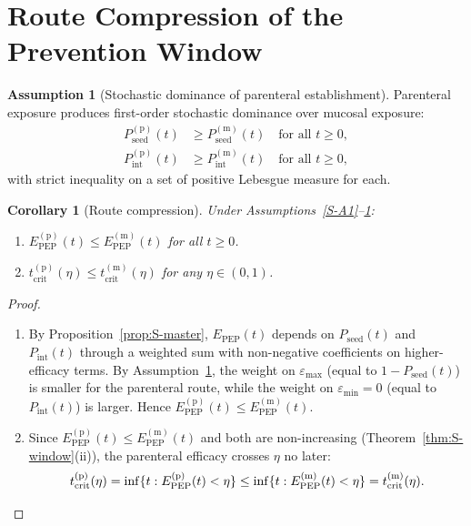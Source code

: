 \documentclass[12pt,a4paper]{article}
\theoremstyle{plain}
\newtheorem{corollary}{Corollary}
\theoremstyle{definition}
\newtheorem{assumption}{Assumption}
\theoremstyle{remark}
\newcommand{\Pint}{P_{\mathrm{int}}}
\newcommand{\Pseed}{P_{\mathrm{seed}}}
\newcommand{\Epep}{E_{\mathrm{PEP}}}
\newcommand{\tcrit}{t_{\mathrm{crit}}}
\begin{document}
\section{Route Compression of the Prevention Window}\label{sec:S5}
\setcounter{theorem}{0}
\setcounter{corollary}{0}
\setcounter{lemma}{0}
\setcounter{assumption}{3}

\begin{assumption}[Stochastic dominance of parenteral establishment]\label{S-A4}
Parenteral exposure produces first-order stochastic dominance over mucosal exposure:
\begin{align}
    \Pseed^{(\mathrm{p})}(t) &\geq \Pseed^{(\mathrm{m})}(t) \quad \text{for all } t \geq 0, \label{eq:S-sd-seed}\\
    \Pint^{(\mathrm{p})}(t) &\geq \Pint^{(\mathrm{m})}(t) \quad \text{for all } t \geq 0, \label{eq:S-sd-int}
\end{align}
with strict inequality on a set of positive Lebesgue measure for each.
\end{assumption}

\begin{corollary}[Route compression]\label{cor:S-compression}
Under Assumptions~\ref{S-A1}--\ref{S-A4}:
\begin{enumerate}
    \item $\Epep^{(\mathrm{p})}(t) \leq \Epep^{(\mathrm{m})}(t)$ for all $t \geq 0$.
    \item $\tcrit^{(\mathrm{p})}(\eta) \leq \tcrit^{(\mathrm{m})}(\eta)$ for any $\eta \in (0,1)$.
\end{enumerate}
\end{corollary}

\begin{proof}\leavevmode
\begin{enumerate}
    \item[(i)] By Proposition~\ref{prop:S-master}, $\Epep(t)$ depends on $\Pseed(t)$ and $\Pint(t)$ through a weighted sum with non-negative coefficients on higher-efficacy terms. By Assumption~\ref{S-A4}, the weight on $\varepsilon_{\max}$ (equal to $1 - \Pseed(t)$) is smaller for the parenteral route, while the weight on $\varepsilon_{\min} = 0$ (equal to $\Pint(t)$) is larger. Hence $\Epep^{(\mathrm{p})}(t) \leq \Epep^{(\mathrm{m})}(t)$.

    \item[(ii)] Since $\Epep^{(\mathrm{p})}(t) \leq \Epep^{(\mathrm{m})}(t)$ and both are non-increasing (Theorem~\ref{thm:S-window}(ii)), the parenteral efficacy crosses $\eta$ no later:
    \[
        \tcrit^{(\mathrm{p})}(\eta) = \inf\{t : \Epep^{(\mathrm{p})}(t) < \eta\} \leq \inf\{t : \Epep^{(\mathrm{m})}(t) < \eta\} = \tcrit^{(\mathrm{m})}(\eta). \qedhere
    \]
\end{enumerate}
\end{proof}
\end{document}
